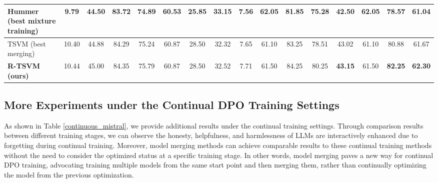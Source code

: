\begin{table*}
{\begin{tabular}{lcccccccc|c|cc|cccc}
      Hummer (best mixture training)           & 9.79                                      & 44.50            & 83.72                                      & 74.89                                  & 60.53                                 & 25.85                                   & 33.15                         & 7.56     & 62.05           & 81.85           & 75.28       & 42.50 & 62.05 & 78.57 & 61.04             \\ \midrule
      TSVM (best merging)                                    & 10.40                                     & 44.88            & 84.29                                      & 75.24                                  & 60.87                                 & 28.50                                   & 32.32                         & 7.65     & 61.10           & 83.25           & 78.51       & 43.02 & 61.10 & 80.88 & 61.67  \\
        \textbf{R-TSVM (ours)}                                   & 10.44                                    & 45.00            & 84.35                                      & 75.79                                  & 60.87                                 & 28.50                                   & 32.52                         & 7.71     & 61.50           & 84.25           & 80.25       & \textbf{43.15} & 61.50 & \textbf{82.25} & \textbf{62.30}  \\
      \bottomrule
    \end{tabular}
  }
\end{table*}


\subsection{More Experiments under the Continual DPO Training Settings} \label{appendix_continual}
As shown in Table \ref{continuous_mistral}, we provide additional results under the continual training settings. Through comparison results between different training stages, we can observe the honesty, helpfulness, and harmlessness of LLMs are interactively enhanced due to forgetting during continual training. Moreover, model merging methods can achieve comparable results to these continual training methods without the need to consider the optimized status at a specific training stage. In other words, model merging paves a new way for continual DPO training, advocating training multiple models from the same start point and then merging them, rather than continually optimizing the model from the previous optimization. 

